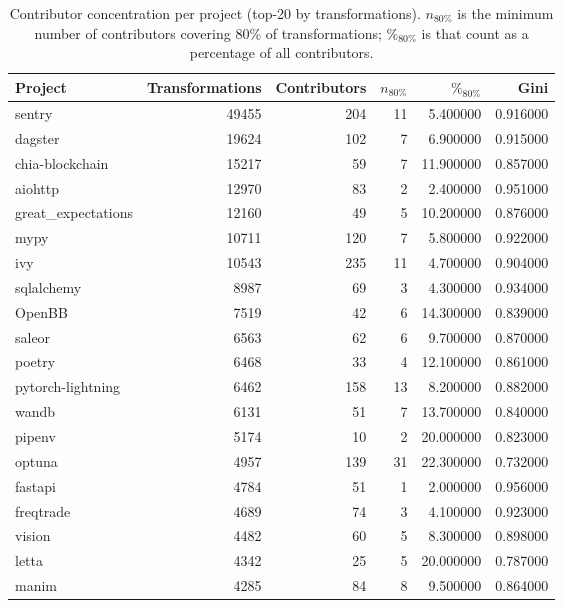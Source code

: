\begin{table}
\caption{Contributor concentration per project (top-20 by transformations). $n_{80\%}$ is the minimum number of contributors covering 80\% of transformations; $\%_{80\%}$ is that count as a percentage of all contributors.}
\label{tab:contributor-concentration}
\begin{tabular}{lrrrrr}
\toprule
Project & Transformations & Contributors & $n_{80\%}$ & $\%_{80\%}$ & Gini \\
\midrule
sentry & \num{49455} & 204 & 11 & 5.400000 & 0.916000 \\
dagster & \num{19624} & 102 & 7 & 6.900000 & 0.915000 \\
chia-blockchain & \num{15217} & 59 & 7 & 11.900000 & 0.857000 \\
aiohttp & \num{12970} & 83 & 2 & 2.400000 & 0.951000 \\
great_expectations & \num{12160} & 49 & 5 & 10.200000 & 0.876000 \\
mypy & \num{10711} & 120 & 7 & 5.800000 & 0.922000 \\
ivy & \num{10543} & 235 & 11 & 4.700000 & 0.904000 \\
sqlalchemy & \num{8987} & 69 & 3 & 4.300000 & 0.934000 \\
OpenBB & \num{7519} & 42 & 6 & 14.300000 & 0.839000 \\
saleor & \num{6563} & 62 & 6 & 9.700000 & 0.870000 \\
poetry & \num{6468} & 33 & 4 & 12.100000 & 0.861000 \\
pytorch-lightning & \num{6462} & 158 & 13 & 8.200000 & 0.882000 \\
wandb & \num{6131} & 51 & 7 & 13.700000 & 0.840000 \\
pipenv & \num{5174} & 10 & 2 & 20.000000 & 0.823000 \\
optuna & \num{4957} & 139 & 31 & 22.300000 & 0.732000 \\
fastapi & \num{4784} & 51 & 1 & 2.000000 & 0.956000 \\
freqtrade & \num{4689} & 74 & 3 & 4.100000 & 0.923000 \\
vision & \num{4482} & 60 & 5 & 8.300000 & 0.898000 \\
letta & \num{4342} & 25 & 5 & 20.000000 & 0.787000 \\
manim & \num{4285} & 84 & 8 & 9.500000 & 0.864000 \\
\bottomrule
\end{tabular}
\end{table}
